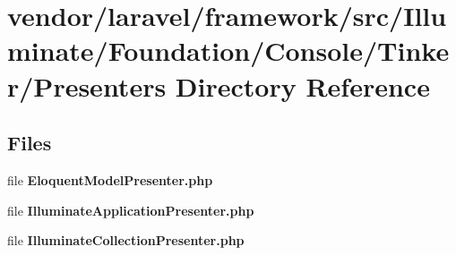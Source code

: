 \section{vendor/laravel/framework/src/\+Illuminate/\+Foundation/\+Console/\+Tinker/\+Presenters Directory Reference}
\label{dir_9430318c841d1ee566adb79d9532ff69}
\subsection*{Files}
\begin{DoxyCompactItemize}
\item 
file {\bf Eloquent\+Model\+Presenter.\+php}
\item 
file {\bf Illuminate\+Application\+Presenter.\+php}
\item 
file {\bf Illuminate\+Collection\+Presenter.\+php}
\end{DoxyCompactItemize}
